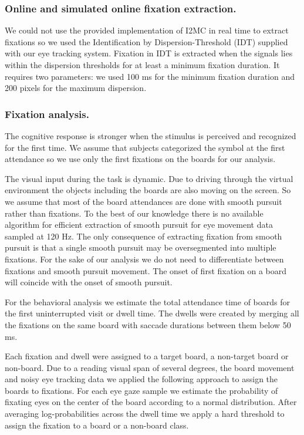 \documentclass[12pt]{iopart}
\begin{document}
\subsubsection*{Online and simulated online fixation extraction.}
We could not use the provided implementation of I2MC in real time
to extract fixations so we used the Identification by Dispersion-Threshold (IDT)
supplied with our eye tracking system. Fixation in IDT is extracted
when the signals lies within the dispersion thresholds for at least a minimum fixation duration.
It requires two parameters: we used 100 ms for the minimum fixation duration
and 200 pixels for the maximum dispersion.

\subsubsection*{Fixation analysis.}
The cognitive response is stronger when the stimulus is perceived and recognized
for the first time. We assume that subjects categorized the symbol at the first
attendance so we use only the first fixations on the boards for our analysis.

The visual input during the task is dynamic. Due to driving through
the virtual environment the objects including the boards are also moving on the screen.
So we assume that most of the board attendances are done with
smooth pursuit rather than fixations. 
To the best of our knowledge there is no available algorithm for efficient
extraction of smooth pursuit for eye movement data sampled at 120 Hz.
The only consequence of 
extracting fixation from smooth pursuit is that a single smooth pursuit
may be oversegmented into multiple fixations.
For the sake of our analysis we do not need to differentiate between
fixations and smooth pursuit movement. The onset of first fixation on a board
will coincide with the onset of smooth pursuit.

For the behavioral analysis we estimate the total attendance time of boards
for the first uninterrupted visit or dwell time. The dwells were created
by merging all the fixations on the same board with saccade durations
between them below 50 ms.

Each fixation and dwell were assigned to a target board, a non-target board or non-board.
Due to a reading visual span of several degrees, the board movement and 
noisy eye tracking data we applied the following approach to assign the boards
to fixations. For each eye gaze sample we estimate the probability of
fixating eyes on the center of the board according to a normal distribution.
After averaging log-probabilities across the dwell time we apply a hard
threshold to assign the fixation to a board or a non-board class.
\end{document}

